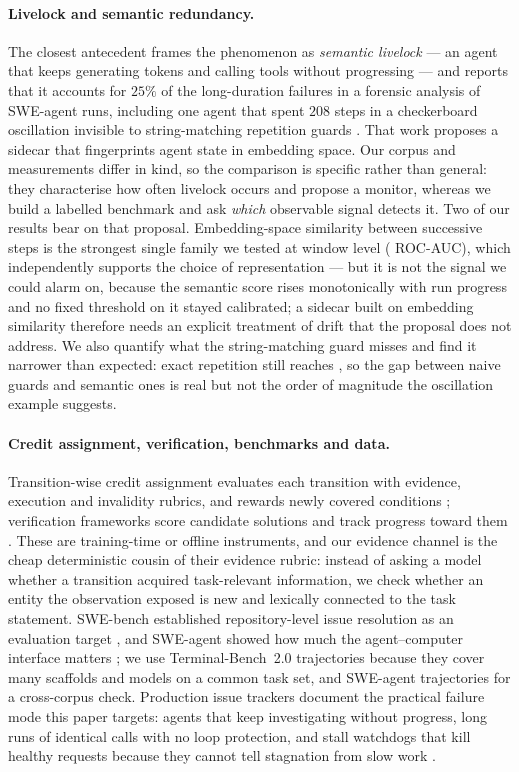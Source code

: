 \paragraph{Livelock and semantic redundancy.}
The closest antecedent frames the phenomenon as \emph{semantic livelock} --- an agent that keeps generating
tokens and calling tools without progressing --- and reports that it accounts for $25\%$ of the
long-duration failures in a forensic analysis of SWE-agent runs, including one agent that spent $208$ steps
in a checkerboard oscillation invisible to string-matching repetition guards \cite{khanna2026zombie}. That
work proposes a sidecar that fingerprints agent state in embedding space. Our corpus and measurements
differ in kind, so the comparison is specific rather than general: they characterise how often livelock
occurs and propose a monitor, whereas we build a labelled benchmark and ask \emph{which} observable signal
detects it. Two of our results bear on that proposal. Embedding-space similarity between successive steps
is the strongest single family we tested at window level (\paucBFoursemantic{} ROC-AUC), which independently
supports the choice of representation --- but it is not the signal we could alarm on, because the semantic
score rises monotonically with run progress and no fixed threshold on it stayed calibrated; a sidecar built
on embedding similarity therefore needs an explicit treatment of drift that the proposal does not address.
We also quantify what the string-matching guard misses and find it narrower than expected: exact repetition
still reaches \paucBTworepThree{}, so the gap between naive guards and semantic ones is real but not the
order of magnitude the oscillation example suggests.

\paragraph{Credit assignment, verification, benchmarks and data.}
Transition-wise credit assignment evaluates each transition with evidence, execution and invalidity
rubrics, and rewards newly covered conditions \cite{zhang2026trca}; verification frameworks score candidate
solutions and track progress toward them \cite{kwok2026verifier}. These are training-time or offline
instruments, and our evidence channel is the cheap deterministic cousin of their evidence rubric: instead
of asking a model whether a transition acquired task-relevant information, we check whether an entity the
observation exposed is new and lexically connected to the task statement. SWE-bench established
repository-level issue resolution as an evaluation target \cite{jimenez2024swebench}, and SWE-agent showed
how much the agent--computer interface matters \cite{yang2024sweagent}; we use Terminal-Bench~2.0
trajectories \cite{yoonholee2026tb2} because they cover many scaffolds and models on a common task set, and
SWE-agent trajectories \cite{nebius2024sweagenttraj} for a cross-corpus check. Production issue trackers
document the practical failure mode this paper targets: agents that keep investigating without progress,
long runs of identical calls with no loop protection, and stall watchdogs that kill healthy requests
because they cannot tell stagnation from slow work \cite{opencode43603,opencode45442}.

